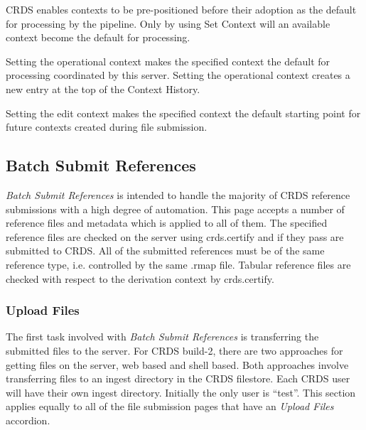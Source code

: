 \documentclass[letterpaper,10pt,english]{sphinxmanual}
\begin{document}
CRDS enables contexts to be pre-positioned before their adoption as the default
for processing by the pipeline.  Only by using Set Context will an available
context become the default for processing.

Setting the operational context makes the specified context the default for
processing coordinated by this server.  Setting the operational context creates
a new entry at the top of the Context History.

Setting the edit context makes the specified context the default starting point
for future contexts created during file submission.


\subsection{Batch Submit References}
\label{web_site_use:batch-submit-references}
\emph{Batch Submit References} is intended to handle the majority of CRDS reference
submissions with a high degree of automation.   This page accepts a number of
reference files and metadata which is applied to all of them.   The specified
reference files are checked on the server using crds.certify and if they pass
are submitted to CRDS.   All of the submitted references must be of the same
reference type,  i.e. controlled by the same .rmap file.   Tabular reference
files are checked with respect to the derivation context by crds.certify.
\begin{figure}[htbp]
\centering

\end{figure}


\subsubsection{Upload Files}
\label{web_site_use:upload-files}
The first task involved with \emph{Batch Submit References} is transferring the
submitted files to the server.  For CRDS build-2,  there are two approaches for
getting files on the server,  web based and shell based.   Both approaches
involve transferring files to an ingest directory in the CRDS filestore.  Each
CRDS user will have their own ingest directory.   Initially the only user is
``test''.   This section applies equally to all of the file submission pages that
have an \emph{Upload Files} accordion.
\end{document}
